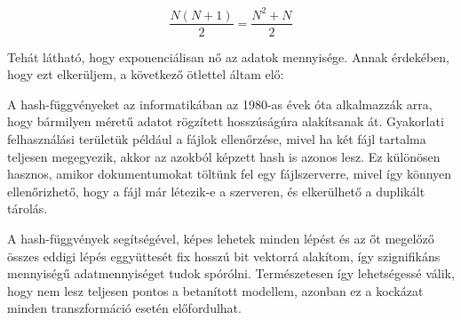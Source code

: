 \[\frac{N(N+1)}{2} = \frac{N^2+N}{2}\]

Tehát látható, hogy exponenciálisan nő az adatok mennyisége. Annak érdekében, hogy ezt elkerüljem, a következő ötlettel áltam elő:

A hash-függvényeket az informatikában az 1980-as évek óta alkalmazzák arra, hogy bármilyen méretű adatot rögzített hosszúságúra alakítsanak át. Gyakorlati felhasználási területük például a fájlok ellenőrzése, mivel ha két fájl tartalma teljesen megegyezik, akkor az azokból képzett hash is azonos lesz. Ez különösen hasznos, amikor dokumentumokat töltünk fel egy fájlszerverre, mivel így könnyen ellenőrizhető, hogy a fájl már létezik-e a szerveren, és elkerülhető a duplikált tárolás.

A hash-függvények segítségével, képes lehetek minden lépést és az őt megelőző összes eddigi lépés eggyüttesét  fix hosszú bit vektorrá alakítom, így szignifikáns mennyiségű adatmennyiséget tudok spórólni. 
Természetesen így lehetségessé válik, hogy nem lesz teljesen pontos a betanított modellem, azonban ez a kockázat minden transzformáció esetén előfordulhat. 

